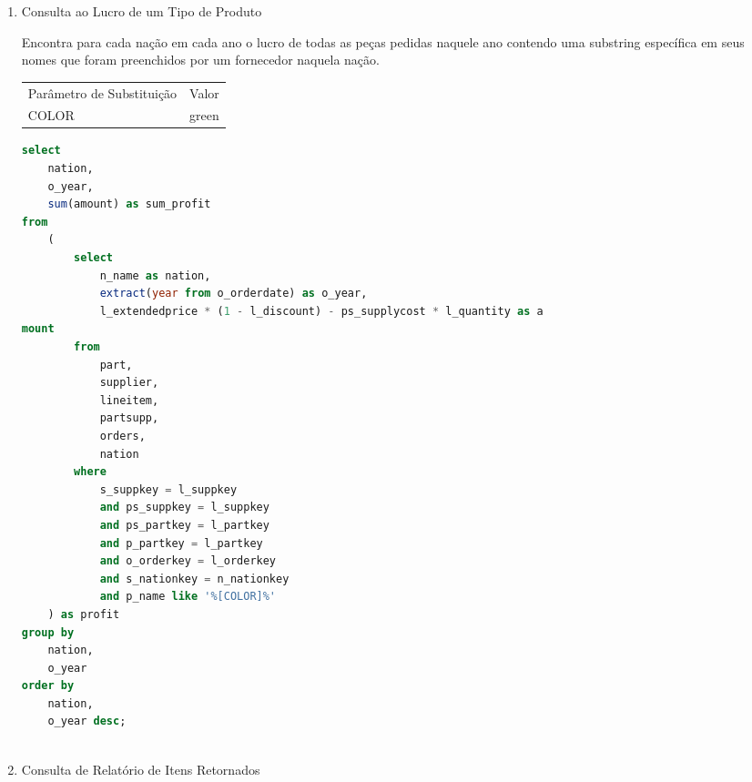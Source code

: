 \begin{enumerate}
	\begin{lstlisting}[language=SQL]
select
	o_year,
	sum(case
		when nation = '[NATION]' 
		then volume
		else 0
	end) / sum(volume) as mkt_share
from
	(
		select
			extract(year from o_orderdate) as o_year,
			l_extendedprice * (1 - l_discount) as volume,
			n2.n_name as nation
		from
			part,
			supplier,
			lineitem,
			orders,
			customer,
			nation n1,
			nation n2,
			region
		where
			p_partkey = l_partkey
			and s_suppkey = l_suppkey
			and l_orderkey = o_orderkey
			and o_custkey = c_custkey
			and c_nationkey = n1.n_nationkey
			and n1.n_regionkey = r_regionkey
			and r_name = '[REGION]'
			and s_nationkey = n2.n_nationkey
			and o_orderdate between date '1995-01-01' and date '1996-12-31'
						and p_type = '[TYPE]'
	) as all_nations
group by
	o_year
order by
	o_year;
	
	\end{lstlisting}

\item Consulta ao Lucro de um Tipo de Produto

    Encontra para cada nação em cada ano o lucro de todas as peças pedidas naquele ano contendo uma substring específica em seus nomes que foram preenchidos por um fornecedor naquela nação.
    
\begin{tabular}{ll}
	Parâmetro de Substituição & Valor\\
	COLOR & green\\
\end{tabular}

	\begin{lstlisting}[language=SQL]
select
	nation,
	o_year,
	sum(amount) as sum_profit
from
	(
		select
			n_name as nation,
			extract(year from o_orderdate) as o_year,
			l_extendedprice * (1 - l_discount) - ps_supplycost * l_quantity as a
mount
		from
			part,
			supplier,
			lineitem,
			partsupp,
			orders,
			nation
		where
			s_suppkey = l_suppkey
			and ps_suppkey = l_suppkey
			and ps_partkey = l_partkey
			and p_partkey = l_partkey
			and o_orderkey = l_orderkey
			and s_nationkey = n_nationkey
			and p_name like '%[COLOR]%'
	) as profit
group by
	nation,
	o_year
order by
	nation,
	o_year desc;
	
	\end{lstlisting}

\item Consulta de Relatório de Itens Retornados


\end{enumerate}
